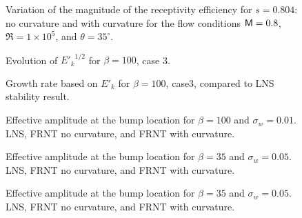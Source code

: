 %
\begin{figure}[p]
\centering
\sethlabel{$\beta$}
\setvlabel{$|\Lambda|$}
\epsfxsize=5.4in 
\caption[Magnitude of the receptivity efficiency with and
without curvature] {Variation of the magnitude of the receptivity efficiency
for $s=0.804$: \solid no curvature and \dashed with curvature for the flow
conditions ${\sf M}=0.8$, $\Re=1\times 10^5$, and $\theta=35^\circ$.
\label{f:LambdaBeta} }
\end{figure}
%
%
\begin{figure}[p]
\centering
{}
\epsfxsize=5.4in 
\caption {Evolution of ${E'_k}^{1/2}$ for $\beta=100$, case 3. \label{f:45} }
\end{figure}
%
\begin{figure}[p]
\centering
\sethlabel{$\beta$}
\setvlabel{$\sigma$}
\epsfxsize=5.4in 
\caption[Growth rate based on $E'_k$ for $\beta=100$] {Growth rate based on
$E'_k$ for $\beta=100$, \dashed case3, compared to \solid LNS stability
result. \label{f:46} }
\end{figure}
%
%
\begin{figure}[p]
\centering
{}
\epsfxsize=5.4in 
\caption [Effective amplitude at the bump location for $\beta=100$ and
$\sigma_w=0.01$]{Effective amplitude at the bump location for $\beta=100$ and
$\sigma_w=0.01$. \linecirc LNS, \dashed FRNT no curvature, and \dotted FRNT
with curvature. \label{f:47} }
\end{figure}
%
%
\begin{figure}[p]
\centering
{}
\epsfxsize=5.4in 
\caption [Effective amplitude at the bump location for $\beta=35$ and
$\sigma_w=0.05$]{Effective amplitude at the bump location for $\beta=35$ and
$\sigma_w=0.05$. \linecirc LNS, \dashed FRNT no curvature, and \dotted FRNT
with curvature.
\label{f:48} }
\end{figure}
%
\clearpage
%
%
\begin{figure}[p]
\centering
{}
\epsfxsize=5.4in 
\caption [Effective amplitude at the bump location for $\beta=35$ and
$\sigma_w=0.05$]{Effective amplitude at the bump location for $\beta=35$ and
$\sigma_w=0.05$. \linecirc LNS, \dashed FRNT no curvature, and \dotted FRNT
with curvature. \label{f:49} }
\end{figure}
